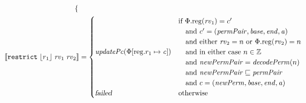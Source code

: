 \documentclass[a4paper]{article}
\newcommand{\update}[2]{[#1 \mapsto #2]}
\newcommand{\sem}[1]{\left\llbracket #1 \right\rrbracket}
\newcommand{\var}[1]{\mathit{#1}}
\newcommand{\rv}{\var{rv}}
\newcommand{\gl}{\var{g}}
\newcommand{\addr}{\var{a}}
\newcommand{\start}{\var{base}}
\newcommand{\addrend}{\var{end}}
\newcommand{\perm}{\var{perm}}
\newcommand{\permp}{\var{permPair}}
\newcommand{\stdcap}[1][(\perm,\gl)]{\left(#1,\start,\addrend,\addr \right)}
\newcommand{\plainproj}[1]{\mathrm{#1}}
\newcommand{\memreg}[1][\Phi]{#1.\plainproj{reg}}
\newcommand{\updateReg}[3][\Phi]{#1\update{\plainproj{reg}.#2}{#3}}
\newcommand{\failed}{\textsl{failed}}
\newcommand{\plainfun}[2]{
  \ifthenelse{\equal{#2}{}}
             {\mathit{#1}}
             {\mathit{#1}(#2)}
}
\newcommand{\decodePerm}{\plainfun{decodePerm}{}}
\newcommand{\stdUpdatePc}[1]{\plainfun{updatePc}{#1}}
\newcommand{\ints}{\mathbb{Z}}
\newcommand{\refreg}[1]{\lfloor #1 \rfloor}
\newcommand{\zinstr}[1]{\mathtt{#1}}
\newcommand{\threeinstr}[4]{\zinstr{#1} \; #2 \; #3 \; #4}
\newcommand{\restrict}[3]{\threeinstr{restrict}{#1}{#2}{#3}}
\begin{document}
\begin{align*}
\begin{cases}
                                             \end{cases} 
\\
  \sem{\restrict{\refreg{r_1}}{\rv_1}{\rv_2}}           & =
                                             \begin{cases}
                                               \stdUpdatePc{\updateReg{r_1}{\var{c}}}  &
                                                 \arraycolsep=0pt
                                                 \begin{array}{l}
                                                   \text{if $\memreg(\rv_1) = c'$}\\
                                                   \quad\text{and $c' = \stdcap[\permp]$}\\
                                                   \quad\text{and either $\rv_2 = n$ or $\memreg(\rv_2) = n$}\\
                                                   \quad\text{and in either case $n \in \ints$}\\
                                                   \quad\text{and $\var{newPermPair} = \decodePerm(n)$}\\
                                                   \quad\text{and $\var{newPermPair} \sqsubseteq \permp$}\\
                                                   \quad\text{and $c = (\var{newPerm},\start,\addrend,\addr)$}
                                                 \end{array}\\
                                               \failed                   & \text{otherwise}
                                             \end{cases} 
\end{align*}
\end{document}
